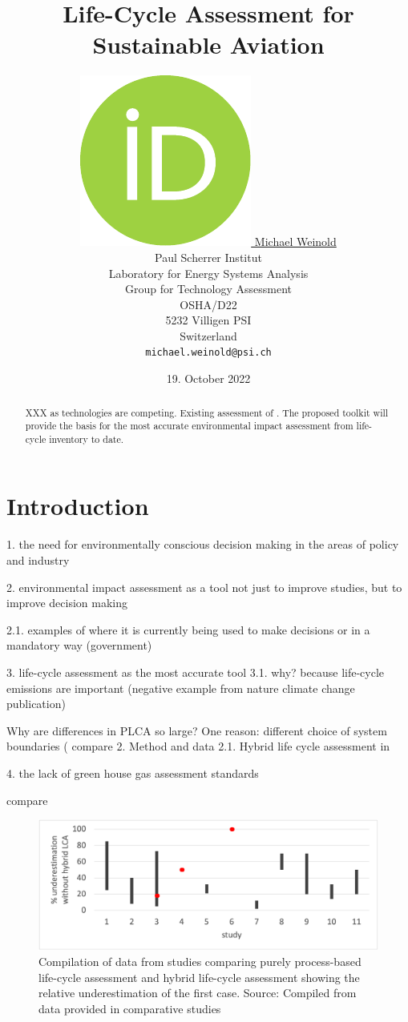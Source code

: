 \documentclass{article}
\title{Life-Cycle Assessment for Sustainable Aviation}
\author{
    \href{https://orcid.org/0000-0003-4859-2650}
    {\includegraphics[scale=0.06]{auxiliary/figures/orcid.pdf}
    \hspace{1mm}
    Michael Weinold} \\
	Paul Scherrer Institut\\
	Laboratory for Energy Systems Analysis\\
	Group for Technology Assessment\\
	OSHA/D22\\
    5232 Villigen PSI \\
    Switzerland \\
	\texttt{michael.weinold@psi.ch} \\
}
\date{19. October 2022}
\begin{document}


\maketitle

\begin{abstract}
    XXX as technologies are competing. Existing assessment of 
	\cite{becattini_role_2021}. The proposed toolkit will provide the basis for the most accurate environmental impact assessment from life-cycle inventory to date. 
\end{abstract}

\section{Introduction}

    1. the need for environmentally conscious decision making in the areas of policy and industry
    
    2. environmental impact assessment as a tool not just to improve studies, but to improve decision making
    
        2.1. examples of where it is currently being used to make decisions or in a mandatory way (government)
    
    
    
    3. life-cycle assessment as the most accurate tool
        3.1. why? because life-cycle emissions are important (negative example from nature climate change publication)
        
        Why are differences in PLCA so large? One reason: different choice of system boundaries ( compare 2. Method and data 2.1. Hybrid life cycle assessment in \cite{teh_hybrid_2017}
        
    4. the lack of green house gas assessment standards
    
    compare \cite{bourgault_documentation_2021}
        
\begin{figure}[h!]
	\centering
	\includegraphics[width=\textwidth]{figures/underestimation_excel.png}
	\caption{Compilation of data from studies comparing purely process-based life-cycle assessment and hybrid life-cycle assessment showing the relative underestimation of the first case. Source: Compiled from data provided in comparative studies \cite{rebitzer_input-output_2002}\cite{lenzen_errors_2000}\cite{agez_hybridization_2020}\cite{agez_correcting_2022}\cite{agez_lifting_2019}}
	\label{fig:performance}
\end{figure}
\end{document}
